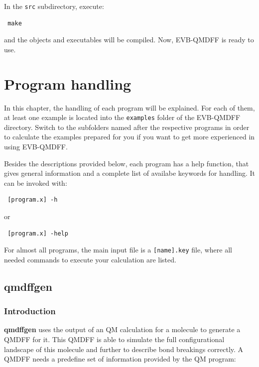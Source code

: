 \documentclass[12pt,a4paper]{scrartcl}
\begin{document}
In the \texttt{src} subdirectory, execute:

\begin{verbatim}
 make
\end{verbatim}

and the objects and executables will be compiled. 
Now, EVB-QMDFF is ready to use.


\newpage


\section{Program handling}

In this chapter, the handling of each program will be explained. For each of them, at least
one example is located into the \texttt{examples} folder of the EVB-QMDFF directory.
Switch to the subfolders named after the respective programs in order to calculate 
the examples prepared for you if you want to get more experienced in using EVB-QMDFF.

Besides the descriptions provided below, each program has a help function, that 
gives general information and a complete list of availabe keywords for handling.
It can be invoked with:

\begin{verbatim}
 [program.x] -h
\end{verbatim}

or 

\begin{verbatim}
 [program.x] -help
\end{verbatim}

For almost all programs, the main input file is a \texttt{[name].key} file, where all needed 
commands to execute your calculation are listed.

\subsection{qmdffgen}

\subsubsection{Introduction}

\textbf{qmdffgen} uses the output of an QM calculation for a molecule to generate a QMDFF for it.
This QMDFF is able to simulate the full configurational landscape of this molecule and further 
to describe bond breakings correctly.
A QMDFF needs a predefine set of information provided by the QM program:
\end{document}
